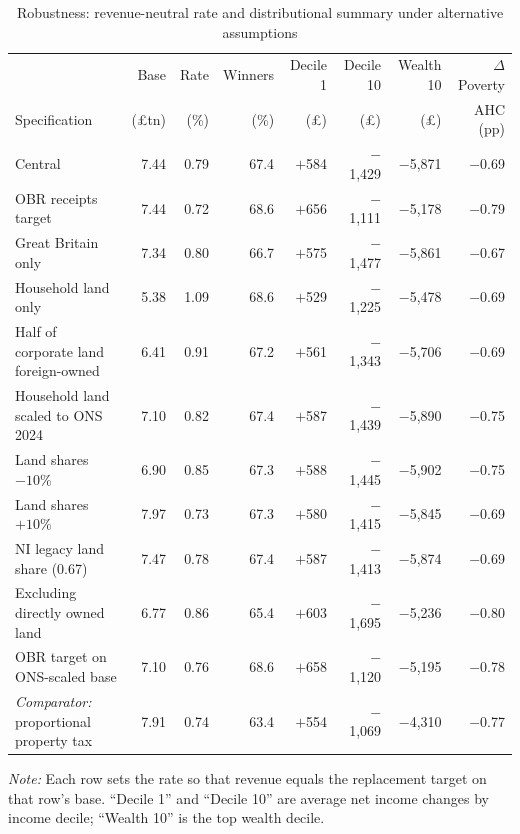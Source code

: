 \begin{table}[htbp]
\centering
\footnotesize
\caption{Robustness: revenue-neutral rate and distributional summary under alternative assumptions}
\label{tab:robustness}
\footnotesize
\setlength{\tabcolsep}{4pt}
\begin{tabular}{lrrrrrrr}
\toprule
 & Base & Rate & Winners & Decile 1 & Decile 10 & Wealth 10 & $\Delta$ Poverty \\
Specification & (\pounds tn) & (\%) & (\%) & (\pounds) & (\pounds) & (\pounds) & AHC (pp) \\
\midrule
Central                              & 7.44 & 0.79 & 67.4 & $+$584 & $-$1{,}429 & $-$5{,}871 & $-$0.69 \\
OBR receipts target                  & 7.44 & 0.72 & 68.6 & $+$656 & $-$1{,}111 & $-$5{,}178 & $-$0.79 \\
Great Britain only                   & 7.34 & 0.80 & 66.7 & $+$575 & $-$1{,}477 & $-$5{,}861 & $-$0.67 \\
Household land only                  & 5.38 & 1.09 & 68.6 & $+$529 & $-$1{,}225 & $-$5{,}478 & $-$0.69 \\
Half of corporate land foreign-owned & 6.41 & 0.91 & 67.2 & $+$561 & $-$1{,}343 & $-$5{,}706 & $-$0.69 \\
Household land scaled to ONS 2024    & 7.10 & 0.82 & 67.4 & $+$587 & $-$1{,}439 & $-$5{,}890 & $-$0.75 \\
Land shares $-10$\%                  & 6.90 & 0.85 & 67.3 & $+$588 & $-$1{,}445 & $-$5{,}902 & $-$0.75 \\
Land shares $+10$\%                  & 7.97 & 0.73 & 67.3 & $+$580 & $-$1{,}415 & $-$5{,}845 & $-$0.69 \\
NI legacy land share (0.67)          & 7.47 & 0.78 & 67.4 & $+$587 & $-$1{,}413 & $-$5{,}874 & $-$0.69 \\
Excluding directly owned land        & 6.77 & 0.86 & 65.4 & $+$603 & $-$1{,}695 & $-$5{,}236 & $-$0.80 \\
OBR target on ONS-scaled base        & 7.10 & 0.76 & 68.6 & $+$658 & $-$1{,}120 & $-$5{,}195 & $-$0.78 \\
\midrule
\emph{Comparator:} proportional property tax & 7.91 & 0.74 & 63.4 & $+$554 & $-$1{,}069 & $-$4{,}310 & $-$0.77 \\
\bottomrule
\end{tabular}

\medskip
{\footnotesize\emph{Note:} Each row sets the rate so that revenue equals the replacement target on that row's base. ``Decile 1'' and ``Decile 10'' are average net income changes by income decile; ``Wealth 10'' is the top wealth decile.}
\end{table}

